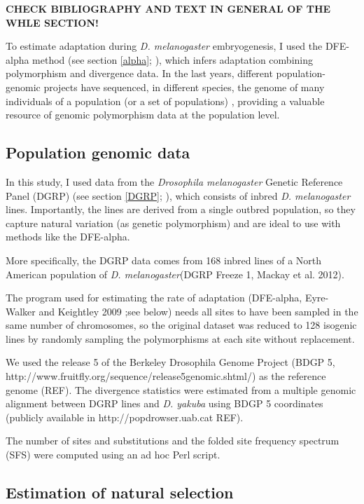 \textbf{CHECK BIBLIOGRAPHY AND TEXT IN GENERAL OF THE WHLE SECTION!}

To estimate adaptation during \textit{D. melanogaster} embryogenesis, I used the DFE-alpha method (see section \ref{alpha}; \citealp{Eyre-Walker2009}), which infers adaptation combining polymorphism and divergence data. 
In the last years, different population-genomic projects have sequenced, in different species, the genome of many individuals of a population (or a set of populations) \citep{The1000GenomesProjectConsortium2010,Mackay2012,Pool2012,Wallberg2014}, providing a valuable resource of genomic polymorphism data at the population level.

\subsection{Population genomic data}

In this study, I used data from the \textit{Drosophila melanogaster} Genetic Reference Panel (DGRP) (see section \ref{DGRP}; \citealp{Mackay2012}), which consists of inbred \textit{D. melanogaster} lines.
Importantly, the lines are derived from a single outbred population, so they capture natural variation (as genetic polymorphism) and are ideal to use with methods like the DFE-alpha. 

More specifically, the DGRP data comes from 168 inbred lines of a North American population of \textit{D. melanogaster}(DGRP Freeze 1, Mackay et al. 2012).

The program used for estimating the rate of adaptation (DFE-alpha, Eyre-Walker and Keightley 2009 ;see below) needs all sites to have been sampled in the same number of chromosomes, so the original dataset was reduced to 128 isogenic lines by randomly sampling the polymorphisms at each site without replacement.

We used the release 5 of the Berkeley Drosophila Genome Project (BDGP 5, http://www.fruitfly.org/sequence/release5genomic.shtml/) as the reference genome (REF).
The divergence statistics were estimated from a multiple genomic alignment between DGRP lines and \textit{D. yakuba} using BDGP 5 coordinates (publicly available in http://popdrowser.uab.cat REF).

The number of sites and substitutions and the folded site frequency spectrum (SFS) were computed using an ad hoc Perl script.

\subsection{Estimation of natural selection}

